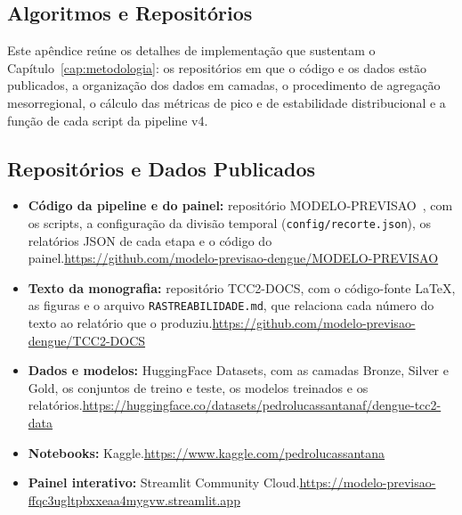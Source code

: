 \begin{apendicesenv}

\partapendices

\chapter{Algoritmos e Repositórios}
\label{ap:algoritmos}

Este apêndice reúne os detalhes de implementação que sustentam o Capítulo~\ref{cap:metodologia}: os repositórios em que o código e os dados estão publicados, a organização dos dados em camadas, o procedimento de agregação mesorregional, o cálculo das métricas de pico e de estabilidade distribucional e a função de cada script da pipeline v4.

\section{Repositórios e Dados Publicados}
\label{ap:repositorios}

\begin{itemize}
    \item \textbf{Código da pipeline e do painel:} repositório MODELO-PREVISAO~\cite{modeloprevisao2026}, com os scripts, a configuração da divisão temporal (\texttt{config/recorte.json}), os relatórios JSON de cada etapa e o código do painel.\newline \url{https://github.com/modelo-previsao-dengue/MODELO-PREVISAO}
    \item \textbf{Texto da monografia:} repositório TCC2-DOCS, com o código-fonte \LaTeX{}, as figuras e o arquivo \texttt{RASTREABILIDADE.md}, que relaciona cada número do texto ao relatório que o produziu.\newline \url{https://github.com/modelo-previsao-dengue/TCC2-DOCS}
    \item \textbf{Dados e modelos:} HuggingFace Datasets, com as camadas Bronze, Silver e Gold, os conjuntos de treino e teste, os modelos treinados e os relatórios.\newline \url{https://huggingface.co/datasets/pedrolucassantanaf/dengue-tcc2-data}
    \item \textbf{Notebooks:} Kaggle.\newline \url{https://www.kaggle.com/pedrolucassantana}
    \item \textbf{Painel interativo:} Streamlit Community Cloud.\newline \url{https://modelo-previsao-ffqc3ugltpbxxeaa4mygvw.streamlit.app}
\end{itemize}


\end{apendicesenv}
